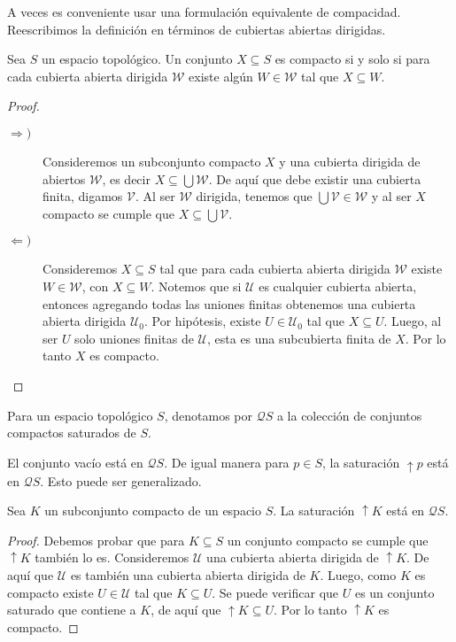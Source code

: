 A veces es conveniente usar una formulación equivalente de compacidad. Reescribimos la definición en términos de cubiertas abiertas dirigidas. 

\begin{lem}
    Sea $S$ un espacio topológico. Un conjunto $X\subseteq S$ es compacto si y solo si para cada cubierta abierta dirigida $\mathcal{W}$ existe algún $W\in \mathcal{W}$ tal que $X\subseteq W$.
\end{lem}

\begin{proof}
\begin{description}
    
    \item[$\Rightarrow )$] Consideremos un subconjunto compacto $X$ y una cubierta dirigida de abiertos $\mathcal{W}$, es decir $X\subseteq\bigcup\mathcal{W}$. De aquí que debe existir una cubierta finita, digamos $\mathcal{V}$. Al ser $\mathcal{W}$ dirigida, tenemos que $\bigcup\mathcal{V}\in \mathcal{W}$ y al ser $X$ compacto se cumple que $X\subseteq \bigcup \mathcal{V}$.
    
    \item[$\Leftarrow )$] Consideremos $X\subseteq S$ tal que para cada cubierta abierta dirigida $\mathcal{W}$ existe $W\in \mathcal{W}$, con $X\subseteq W$. Notemos que si $\mathcal{U}$ es cualquier cubierta abierta, entonces agregando todas las uniones finitas obtenemos una cubierta abierta dirigida $\mathcal{U}_0$. Por hipótesis, existe $U\in\mathcal{U}_0$ tal que $X\subseteq U$. Luego, al ser $U$ solo uniones finitas de $\mathcal{U}$, esta es una subcubierta finita de $X$. Por lo tanto $X$ es compacto.
    \end{description}
    \end{proof}
    
\begin{dfn}\label{Csaturado}
    Para un espacio topológico $S$, denotamos por $\mathcal{Q}S$ a la colección de conjuntos compactos saturados de $S$.
\end{dfn}

El conjunto vacío está en $\mathcal{Q}S$. De igual manera para $p\in S$, la saturación $\uparrow{p}$ está en $\mathcal{Q}S$. Esto puede ser generalizado.

\begin{lem}
    Sea $K$ un subconjunto compacto de un espacio $S$. La saturación $\uparrow{K}$ está en $\mathcal{Q}S.$
\end{lem}

\begin{proof}
    Debemos probar que para $K\subseteq S$ un conjunto compacto se cumple que $\uparrow{K}$ también lo es. Consideremos $\mathcal{U}$ una cubierta abierta dirigida de $\uparrow K$. De aquí que $\mathcal{U}$ es también una cubierta abierta dirigida de $K$. Luego, como $K$ es compacto existe $U\in \mathcal{U}$ tal que $K\subseteq U$. Se puede verificar que $U$ es un conjunto saturado que contiene a $K$, de aquí que $\uparrow K\subseteq U$. Por lo tanto $\uparrow K$ es compacto.
\end{proof}

